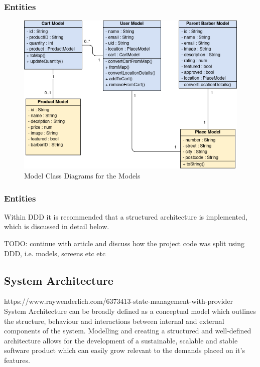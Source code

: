 \documentclass[12pt]{article}
\begin{document}
	\subsubsection{Entities}
	
	\begin{figure}[H]
		\centering
		\includegraphics[scale=0.7]{images/model-class-diagrams.png}
		\caption{Model Class Diagrams for the Models}
		\label{fig:model-class-diagrams}
	\end{figure}
	
	\subsubsection{Entities}
	
	Within DDD it is recommended that a structured architecture is implemented, which is discussed in detail below.
	
	TODO: continue with article	and discuss how the project code was split using DDD, i.e. models, screens etc etc
	
	\subsection{System Architecture}
	https://www.raywenderlich.com/6373413-state-management-with-provider
	System Architecture can be broadly defined as a conceptual model which outlines the structure, behaviour and interactions between internal and external components of the system. Modelling and creating a structured and well-defined architecture allows for the development of a sustainable, scalable and stable software product which can easily grow relevant to the demands placed on it's features.
	
\end{document}
